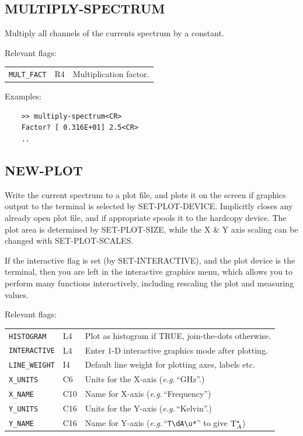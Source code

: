 \documentclass[11pt,twoside]{report}
\newcommand{\eg}{{\it e.g.\,}}
\begin{document}
\subsection{MULTIPLY-SPECTRUM} 

Multiply all channels of the currents spectrum by a constant.

Relevant flags:\\
\begin{tabular}{lll}
  \verb+MULT_FACT+ & R4 & Multiplication factor.
\end{tabular}

Examples:
\begin{verbatim}
    >> multiply-spectrum<CR>
    Factor? [ 0.316E+01] 2.5<CR>
    ..
\end{verbatim}

\subsection{NEW-PLOT} 

Write the current spectrum to a plot file, and plots it on the screen if
graphics output to the terminal is selected by SET-PLOT-DEVICE.
  
Implicitly closes any already open plot file, and if appropriate spools it to
the hardcopy device. The plot area is determined by SET-PLOT-SIZE, while the
X \& Y axis scaling can be changed with SET-PLOT-SCALES.

If the interactive flag is set (by SET-INTERACTIVE), and the plot device is
the terminal, then you are left in the interactive graphics menu, which
allows you to perform many functions interactively, including rescaling the
plot and measuring values. 

Relevant flags:\\
\begin{tabular}{lll}
  \verb+HISTOGRAM+   & L4 & Plot as histogram if TRUE, join-the-dots otherwise.\\
  \verb+INTERACTIVE+ & L4 & Enter 1-D interactive graphics mode after
                            plotting.\\
  \verb+LINE_WEIGHT+ & I4  & Default line weight for plotting axes, labels etc.\\
  \verb+X_UNITS+     & C6 & Units for the X-axis (\eg ``GHz''.)\\
  \verb+X_NAME+      & C10 & Name for X-axis (\eg ``Frequency'')\\
  \verb+Y_UNITS+     & C16 & Units for the Y-axis (\eg ``Kelvin''.)\\
  \verb+Y_NAME+      & C16 & Name for Y-axis (\eg ``\verb+T\dA\u*+'' to 
                             give ${\rm T}_A^*$)
\end{tabular}
\end{document}
